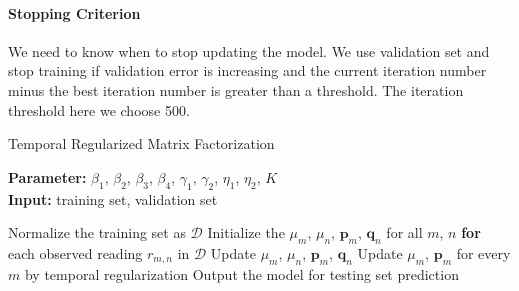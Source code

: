 \paragraph*{Stopping Criterion}

We need to know when to stop updating the model.
We use validation set and stop training if validation error is increasing and the current iteration number minus the best iteration number is greater than a threshold.
 The iteration threshold here we choose 500. 

\begin{algorithm}
	\caption{Temporal Regularized Matrix Factorization}
	\label{alg:TRMF}
	\textbf{Parameter:} $\beta_1$, $\beta_2$, $\beta_3$, $\beta_4$, $\gamma_1$, $\gamma_2$, $\eta_1$, $\eta_2$, $K$\\
	\textbf{Input:} training set, validation set
	\begin{algorithmic}
		\State Normalize the training set as $\mathcal{D}$
		\State Initialize the $\mu_m$, $\mu_n$, $\mathbf{p}_m$, $\mathbf{q}_n$ for all $m$, $n$
		\Repeat
			\State \textbf{for} each observed reading $r_{m,n}$ in $\mathcal{D}$
				\State \indent Update $\mu_m$, $\mu_n$, $\mathbf{p}_{m}$, $\mathbf{q}_{n}$
			\State Update $\mu_m$, $\mathbf{p}_m$ for every $m$ by temporal regularization
		\State Output the model for testing set prediction
	\end{algorithmic}
\end{algorithm}


